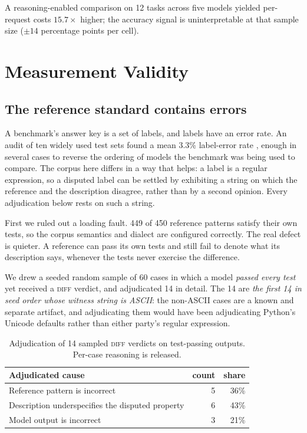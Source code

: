 \documentclass[11pt]{article}
\begin{document}
A reasoning-enabled comparison on 12 tasks across five models yielded
per-request costs $15.7\times$ higher; the accuracy signal is uninterpretable
at that sample size ($\pm14$ percentage points per cell).

\section{Measurement Validity}
\label{sec:validity}

\subsection{The reference standard contains errors}
\label{sec:goldstandard}

A benchmark's answer key is a set of labels, and labels have an error rate.
An audit of ten widely used test sets found a mean 3.3\% label-error rate
\citep{northcutt2021labelerrors}, enough in several cases to reverse the ordering of
models the benchmark was being used to compare. The corpus here differs in a
way that helps: a label is a regular expression, so a disputed label can be
settled by exhibiting a string on which the reference and the description
disagree, rather than by a second opinion. Every adjudication below rests on
such a string.

First we ruled out a loading fault. 449 of 450 reference patterns satisfy
their own tests, so the corpus semantics and dialect are configured correctly.
The real defect is quieter. A reference can pass its own tests and still fail
to denote what its description says, whenever the tests never exercise the
difference.

We drew a seeded random sample of 60 cases in which a model \emph{passed
every test} yet received a \textsc{diff} verdict, and adjudicated 14 in
detail. The 14 are \emph{the first 14 in seed order whose witness string is
ASCII}: the non-ASCII cases are a known and separate artifact, and
adjudicating them would have been adjudicating Python's Unicode defaults
rather than either party's regular expression.

\begin{table}[htbp]
\centering
\small
\begin{tabular}{lrr}
\toprule
Adjudicated cause & count & share \\
\midrule
Reference pattern is incorrect & 5 & 36\% \\
Description underspecifies the disputed property & 6 & 43\% \\
Model output is incorrect & 3 & 21\% \\
\bottomrule
\end{tabular}
\caption{Adjudication of 14 sampled \textsc{diff} verdicts on test-passing
outputs. Per-case reasoning is released.}
\label{tab:adjudication}
\end{table}
\end{document}
